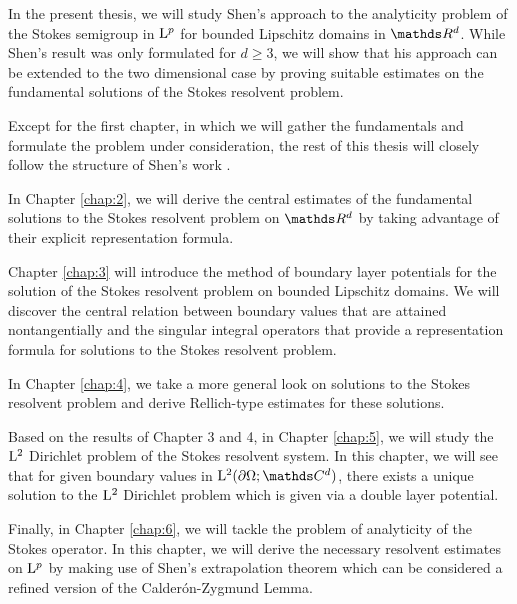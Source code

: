 In the present thesis, we will study Shen's approach to the analyticity problem of the Stokes semigroup in $\mathrm{L}^p$ for bounded Lipschitz domains in $\R^d$.
While Shen's result was only formulated for $d \geq 3$, we will show that his approach can be extended to the two dimensional case by proving suitable estimates on the fundamental solutions of the Stokes resolvent problem.

Except for the first chapter, in which we will gather the fundamentals and formulate the problem under consideration, the rest of this thesis will closely follow the structure of Shen's work \cite{Shen2012}. 

In Chapter \ref{chap:2}, we will derive the central estimates of the fundamental solutions to the Stokes resolvent problem on $\R^d$ by taking advantage of their explicit representation formula.

Chapter \ref{chap:3} will introduce the method of boundary layer potentials for the solution of the Stokes resolvent problem on bounded Lipschitz domains.
We will discover the central relation between boundary values that are attained nontangentially and the singular integral operators that provide a representation formula for solutions to the Stokes resolvent problem. 

In Chapter \ref{chap:4}, we take a more general look on solutions to the Stokes resolvent problem and derive Rellich-type estimates for these solutions.

Based on the results of Chapter 3 and 4, in Chapter \ref{chap:5}, we will study the $\mathrm{L}^2$ Dirichlet problem of the Stokes resolvent system. In this chapter, we will see that for given boundary values in $\Ell^2(\partial\Omega; \C^d)$, there exists a unique solution to the $\mathrm{L}^2$ Dirichlet problem which is given via a double layer potential.

Finally, in Chapter \ref{chap:6}, we will tackle the problem of analyticity of the Stokes operator. In this chapter, we will derive the necessary resolvent estimates on $\mathrm{L}^p$ by making use of Shen's extrapolation theorem which can be considered a refined version of the Calder\'on-Zygmund Lemma.



